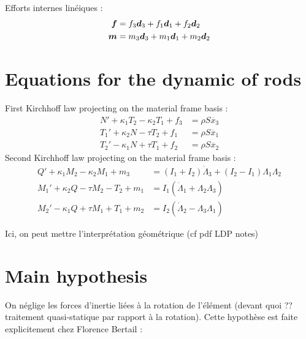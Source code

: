 Efforts internes linéiques :
\begin{subequations}
	\begin{align}
		\boldsymbol{f} &= f_3\boldsymbol{d}_3 + f_1\boldsymbol{d}_1 + f_2\boldsymbol{d}_2
		\\
		\boldsymbol{m} &= m_3\boldsymbol{d}_3 + m_1\boldsymbol{d}_1 + m_2\boldsymbol{d}_2
	\end{align}
\end{subequations}

\section{Equations for the dynamic of rods}

First Kirchhoff law projecting on the material frame basis :
\begin{subequations}
	\begin{align}
		N' + \kappa_1 T_2 - \kappa_2 T_1 + f_3 &= \rho S \ddot{x_3} 
		\\
		T_1' + \kappa_2 N - \tau T_2 + f_1 &= \rho S \ddot{x_1} 
		\\
		T_2' - \kappa_1 N + \tau T_1 + f_2 &= \rho S \ddot{x_2} 
	\end{align}
\end{subequations}
Second Kirchhoff law projecting on the material frame basis :
\begin{subequations}
	\begin{align}
		Q' + \kappa_1 M_2 - \kappa_2 M_1 + m_3 &= (I_1 + I_2)\dot{\Lambda}_3 + (I_2 - I_1)\Lambda_1\Lambda_2
		\\
		M_1' + \kappa_2 Q - \tau M_2 - T_2 + m_1 &= I_1 (\dot{\Lambda}_1 + \Lambda_2 \Lambda_3)
		\\
		M_2' - \kappa_1 Q + \tau M_1 + T_1 + m_2 &= I_2 (\dot{\Lambda}_2 - \Lambda_3 \Lambda_1) 
	\end{align}
\end{subequations}

Ici, on peut mettre l'interprétation géométrique (cf pdf LDP notes)

\section{Main hypothesis}

On néglige les forces d'inertie liées à la rotation de l'élément  (devant quoi ?? traitement quasi-statique par rapport à la rotation). Cette hypothèse est faite explicitement chez Florence Bertail :

\cite{Casati2013}

